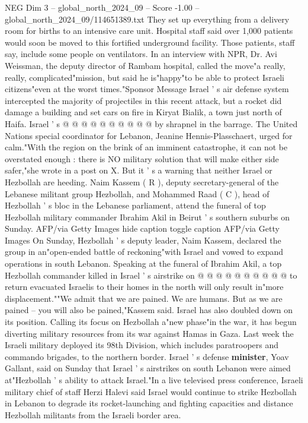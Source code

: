 \begin{textsample}{NEG Dim 3 – global\_north\_2024\_09 – Score -1.00 – global\_north\_2024\_09/114651389.txt}
They set up everything from a delivery room for births to an intensive care unit.
Hospital staff said over 1,000 patients would soon be moved to this fortified underground facility.
Those patients, staff say, include some people on ventilators.
In an interview with NPR, Dr.
Avi Weissman, the deputy director of Rambam hospital, called the move"a really, really, complicated"mission, but said he is"happy"to be able to protect Israeli citizens"even at the worst times."Sponsor Message Israel ' s air defense system intercepted the majority of projectiles in this recent attack, but a rocket did damage a building and set cars on fire in Kiryat Bialik, a town just north of Haifa.
Israel ' s @ @ @ @ @ @ @ @ @ @ by shrapnel in the barrage.
The United Nations special coordinator for Lebanon, Jeanine Hennis-Plasschaert, urged for calm."With the region on the brink of an imminent catastrophe, it can not be overstated enough : there is NO military solution that will make either side safer,"she wrote in a post on X.
But it ' s a warning that neither Israel or Hezbollah are heeding.
Naim Kassem ( R ), deputy secretary-general of the Lebanese militant group Hezbollah, and Mohammed Raad ( C ), head of Hezbollah ' s bloc in the Lebanese parliament, attend the funeral of top Hezbollah military commander Ibrahim Akil in Beirut ' s southern suburbs on Sunday.
AFP/via Getty Images hide caption toggle caption AFP/via Getty Images On Sunday, Hezbollah ' s deputy leader, Naim Kassem, declared the group in an"open-ended battle of reckoning"with Israel and vowed to expand operations in south Lebanon.
Speaking at the funeral of Ibrahim Akil, a top Hezbollah commander killed in Israel ' s airstrike on @ @ @ @ @ @ @ @ @ @ to return evacuated Israelis to their homes in the north will only result in"more displacement.""We admit that we are pained.
We are humans.
But as we are pained -- you will also be pained,"Kassem said.
Israel has also doubled down on its position.
Calling its focus on Hezbollah a"new phase"in the war, it has begun diverting military resources from its war against Hamas in Gaza.
Last week the Israeli military deployed its 98th Division, which includes paratroopers and commando brigades, to the northern border.
Israel ' s defense \textbf{minister}, Yoav Gallant, said on Sunday that Israel ' s airstrikes on south Lebanon were aimed at"Hezbollah ' s ability to attack Israel."In a live televised press conference, Israeli military chief of staff Herzi Halevi said Israel would continue to strike Hezbollah in Lebanon to degrade its rocket-launching and fighting capacities and distance Hezbollah militants from the Israeli border area.

\end{textsample}
